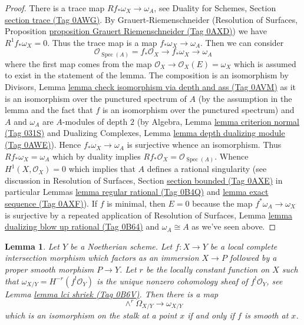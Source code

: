 \documentclass{amsart}
\theoremstyle{plain}
\newtheorem{lemma}[subsection]{Lemma}
\theoremstyle{definition}
\theoremstyle{remark}
\numberwithin{equation}{subsection}
\def\Spec{\mathop{\mathrm{Spec}}}
\begin{document}
\begin{proof}
There is a trace map $Rf_*\omega_X \to \omega_A$, see
Duality for Schemes, Section \href{https://stacks.math.columbia.edu/tag/0AWG}{section trace (Tag 0AWG)}.
By Grauert-Riemenschneider
(Resolution of Surfaces,
Proposition \href{https://stacks.math.columbia.edu/tag/0AXD}{proposition Grauert Riemenschneider (Tag 0AXD)})
we have $R^1f_*\omega_X = 0$.
Thus the trace map is a map $f_*\omega_X \to \omega_A$.
Then we can consider
$$
\mathcal{O}_{\Spec(A)} = f_*\mathcal{O}_X \to f_*\omega_X \to \omega_A
$$
where the first map comes from the map
$\mathcal{O}_X \to \mathcal{O}_X(E) = \omega_X$ which is
assumed to exist in the statement of the lemma.
The composition is an isomorphism by Divisors, Lemma
\href{https://stacks.math.columbia.edu/tag/0AVM}{lemma check isomorphism via depth and ass (Tag 0AVM)}
as it is an isomorphism over the punctured spectrum of $A$
(by the assumption in the lemma and the fact that $f$ is an isomorphism
over the punctured spectrum) and $A$ and $\omega_A$
are $A$-modules of depth $2$ (by
Algebra, Lemma \href{https://stacks.math.columbia.edu/tag/031S}{lemma criterion normal (Tag 031S)} and
Dualizing Complexes, Lemma \href{https://stacks.math.columbia.edu/tag/0AWE}{lemma depth dualizing module (Tag 0AWE)}).
Hence $f_*\omega_X \to \omega_A$ is surjective whence an isomorphism.
Thus $Rf_*\omega_X = \omega_A$ which by duality implies
$Rf_*\mathcal{O}_X = \mathcal{O}_{\Spec(A)}$.
Whence $H^1(X, \mathcal{O}_X) = 0$ which implies that $A$
defines a rational singularity (see discussion in
Resolution of Surfaces, Section
\href{https://stacks.math.columbia.edu/tag/0AXE}{section bounded (Tag 0AXE)} in particular
Lemmas \href{https://stacks.math.columbia.edu/tag/0B4Q}{lemma regular rational (Tag 0B4Q)} and
\href{https://stacks.math.columbia.edu/tag/0AXF}{lemma exact sequence (Tag 0AXF)}).
If $f$ is minimal, then $E = 0$ because the map
$f^*\omega_A \to \omega_X$ is surjective by
a repeated application of Resolution of Surfaces, Lemma
\href{https://stacks.math.columbia.edu/tag/0B64}{lemma dualizing blow up rational (Tag 0B64)}
and $\omega_A \cong A$ as we've seen above.
\end{proof}


\begin{lemma}
\label{duality-lemma-fundamental-class-lci}
Let $Y$ be a Noetherian scheme. Let $f : X \to Y$ be a
local complete intersection morphism which factors
as an immersion $X \to P$ followed by a proper smooth morphism $P \to Y$.
Let $r$ be the locally constant function on
$X$ such that $\omega_{X/Y} = H^{-r}(f^!\mathcal{O}_Y)$
is the unique nonzero cohomology sheaf of $f^!\mathcal{O}_Y$, see
Lemma \href{https://stacks.math.columbia.edu/tag/0B6V}{lemma lci shriek (Tag 0B6V)}.
Then there is a map
$$
\wedge^r\Omega_{X/Y} \longrightarrow \omega_{X/Y}
$$
which is an isomorphism on the stalk at a point $x$ if and only
if $f$ is smooth at $x$.
\end{lemma}
\end{document}

